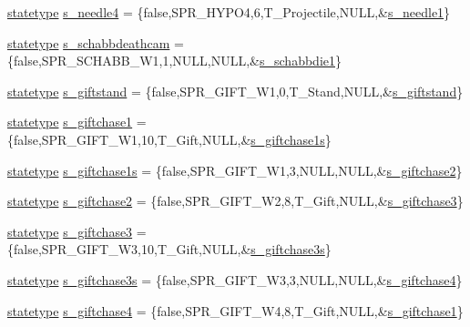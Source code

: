 \begin{DoxyCompactItemize}
\item 
\hyperlink{structstatestruct}{statetype} \hyperlink{WL__ACT2_8C_a18e9f19ac3118dad31a26cc1bc958c6a}{s\_\-needle4} = \{false,SPR\_\-HYPO4,6,T\_\-Projectile,NULL,\&\hyperlink{WL__ACT2_8C_a8bbf1638f0ed9842b39a992ee4e0f5b4}{s\_\-needle1}\}
\item 
\hyperlink{structstatestruct}{statetype} \hyperlink{WL__ACT2_8C_aacdd4aceca1af97b105487c3140e77b1}{s\_\-schabbdeathcam} = \{false,SPR\_\-SCHABB\_\-W1,1,NULL,NULL,\&\hyperlink{WL__DEF_8H_a893439687b453e85400bf0010c99a361}{s\_\-schabbdie1}\}
\item 
\hyperlink{structstatestruct}{statetype} \hyperlink{WL__ACT2_8C_a8dcf4c30942fc3904126b1468012d9ed}{s\_\-giftstand} = \{false,SPR\_\-GIFT\_\-W1,0,T\_\-Stand,NULL,\&\hyperlink{WL__ACT2_8C_a8dcf4c30942fc3904126b1468012d9ed}{s\_\-giftstand}\}
\item 
\hyperlink{structstatestruct}{statetype} \hyperlink{WL__ACT2_8C_a0a40f8197d12177d3e313cbed430ed05}{s\_\-giftchase1} = \{false,SPR\_\-GIFT\_\-W1,10,T\_\-Gift,NULL,\&\hyperlink{WL__ACT2_8C_a5e3c6e535b9aa54261606409389672a4}{s\_\-giftchase1s}\}
\item 
\hyperlink{structstatestruct}{statetype} \hyperlink{WL__ACT2_8C_a5e3c6e535b9aa54261606409389672a4}{s\_\-giftchase1s} = \{false,SPR\_\-GIFT\_\-W1,3,NULL,NULL,\&\hyperlink{WL__ACT2_8C_a75dc21954eaaa0a38f56c87cdcd134e3}{s\_\-giftchase2}\}
\item 
\hyperlink{structstatestruct}{statetype} \hyperlink{WL__ACT2_8C_a75dc21954eaaa0a38f56c87cdcd134e3}{s\_\-giftchase2} = \{false,SPR\_\-GIFT\_\-W2,8,T\_\-Gift,NULL,\&\hyperlink{WL__ACT2_8C_ae0b514d00a5624b824b097d493092cbe}{s\_\-giftchase3}\}
\item 
\hyperlink{structstatestruct}{statetype} \hyperlink{WL__ACT2_8C_ae0b514d00a5624b824b097d493092cbe}{s\_\-giftchase3} = \{false,SPR\_\-GIFT\_\-W3,10,T\_\-Gift,NULL,\&\hyperlink{WL__ACT2_8C_a2c1c030f2327b8a06f1da9513739b7b2}{s\_\-giftchase3s}\}
\item 
\hyperlink{structstatestruct}{statetype} \hyperlink{WL__ACT2_8C_a2c1c030f2327b8a06f1da9513739b7b2}{s\_\-giftchase3s} = \{false,SPR\_\-GIFT\_\-W3,3,NULL,NULL,\&\hyperlink{WL__ACT2_8C_ab24a297fe8e99ef2d421c59406791af7}{s\_\-giftchase4}\}
\item 
\hyperlink{structstatestruct}{statetype} \hyperlink{WL__ACT2_8C_ab24a297fe8e99ef2d421c59406791af7}{s\_\-giftchase4} = \{false,SPR\_\-GIFT\_\-W4,8,T\_\-Gift,NULL,\&\hyperlink{WL__DEF_8H_a0a40f8197d12177d3e313cbed430ed05}{s\_\-giftchase1}\}
\item 

\end{DoxyCompactItemize}
